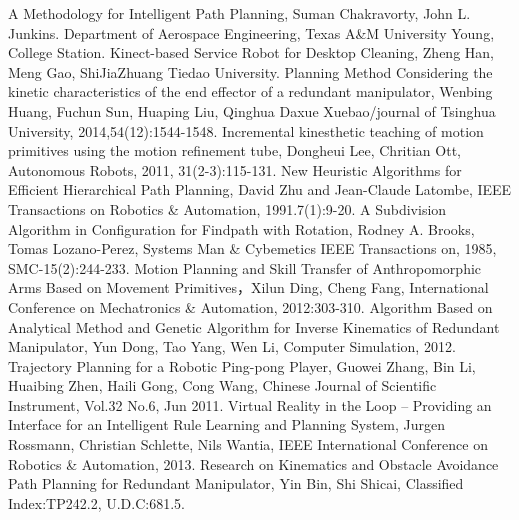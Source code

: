 \documentclass[letterpaper, 10 pt, conference]{ieeeconf}  %
\begin{document}
\begin{thebibliography}{99}

 A Methodology for Intelligent Path Planning, Suman Chakravorty, John L. Junkins. Department of Aerospace Engineering, Texas A\&M University Young, College Station.
 Kinect-based Service Robot for Desktop Cleaning, Zheng Han, Meng Gao, ShiJiaZhuang Tiedao University.
 Planning Method Considering the kinetic characteristics of the end effector of a redundant manipulator, Wenbing Huang, Fuchun Sun, Huaping Liu, Qinghua Daxue Xuebao/journal of Tsinghua University, 2014,54(12):1544-1548.
 Incremental kinesthetic teaching of motion primitives using the motion refinement tube, Dongheui Lee, Chritian Ott, Autonomous Robots, 2011, 31(2-3):115-131.
 New Heuristic Algorithms for Efficient Hierarchical Path Planning,  David Zhu and Jean-Claude Latombe, IEEE Transactions on Robotics \& Automation, 1991.7(1):9-20.
 A Subdivision Algorithm in Configuration for Findpath with Rotation, Rodney A. Brooks, Tomas Lozano-Perez, Systems Man \& Cybemetics IEEE Transactions on, 1985, SMC-15(2):244-233.
 Motion Planning and Skill Transfer of Anthropomorphic Arms Based on Movement Primitives，Xilun Ding, Cheng Fang, International Conference on Mechatronics \& Automation, 2012:303-310.
 Algorithm Based on Analytical Method and Genetic Algorithm for Inverse Kinematics of Redundant Manipulator, Yun Dong, Tao Yang, Wen Li, Computer Simulation, 2012.
 Trajectory Planning for a Robotic Ping-pong Player, Guowei Zhang, Bin Li, Huaibing Zhen, Haili Gong, Cong Wang, Chinese Journal of Scientific Instrument, Vol.32 No.6, Jun 2011.
 Virtual Reality in the Loop – Providing an Interface for an Intelligent Rule Learning and Planning System, Jurgen Rossmann, Christian Schlette, Nils Wantia, IEEE International Conference on Robotics \& Automation, 2013.
 Research on Kinematics and Obstacle Avoidance Path Planning for Redundant Manipulator, Yin Bin, Shi Shicai, Classified Index:TP242.2, U.D.C:681.5.






\end{thebibliography}
\end{document}

